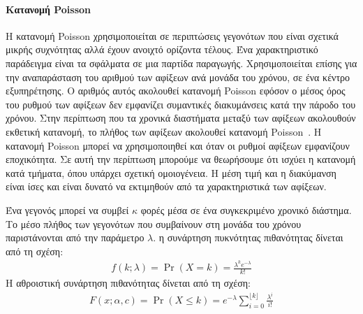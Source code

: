 \documentclass[12pt]{report}
\begin{document}
\paragraph{Κατανομή \textlatin{Poisson}}
Η κατανομή \textlatin{Poisson} χρησιμοποιείται σε περιπτώσεις γεγονότων που είναι σχετικά μικρής συχνότητας αλλά έχουν ανοιχτό ορίζοντα τέλους. Ένα χαρακτηριστικό παράδειγμα είναι τα σφάλματα σε μια παρτίδα παραγωγής. Χρησιμοποιείται επίσης για την αναπαράσταση του αριθμού των αφίξεων ανά μονάδα του χρόνου, σε ένα κέντρο εξυπηρέτησης. Ο αριθμός αυτός ακολουθεί κατανομή \textlatin{Poisson} εφόσον ο μέσος όρος του ρυθμού των αφίξεων δεν εμφανίζει συμαντικές διακυμάνσεις κατά την πάροδο του χρόνου. Στην περίπτωση που τα χρονικά διαστήματα μεταξύ των αφίξεων ακολουθούν εκθετική κατανομή, το πλήθος των αφίξεων ακολουθεί κατανομή \textlatin{Poisson}~\cite{book:07}. Η κατανομή \textlatin{Poisson} μπορεί να χρησιμοποιηθεί και όταν οι ρυθμοί αφίξεων εμφανίζουν εποχικότητα. Σε αυτή την περίπτωση μπορούμε να θεωρήσουμε ότι ισχύει η κατανομή κατά τμήματα, όπου υπάρχει σχετική ομοιογένεια. Η μέση τιμή και η διακύμανση είναι ίσες και είναι δυνατό να εκτιμηθούν από τα χαρακτηριστικά των αφίξεων.

Ένα γεγονός μπορεί να συμβεί \(\kappa\) φορές μέσα σε ένα συγκεκριμένο χρονικό διάστημα. Το μέσο πλήθος των γεγονότων που συμβαίνουν στη μονάδα του χρόνου παριστάνονται από την παράμετρο \(\lambda\). η συνάρτηση πυκνότητας πιθανότητας δίνεται από τη σχέση:
\begin{align*}
f(k;\lambda )=\Pr(X=k)={\frac {\lambda ^{k}e^{-\lambda }}{k!}}
\end{align*}
Η αθροιστική συνάρτηση πιθανότητας δίνεται από τη σχέση:
\begin{align*}
F(x;\alpha,c)=\Pr(X \leq k)=e^{-\lambda }\sum _{i=0}^{\lfloor k\rfloor }{\frac {\lambda ^{i}}{i!}}
\end{align*}
\end{document}

